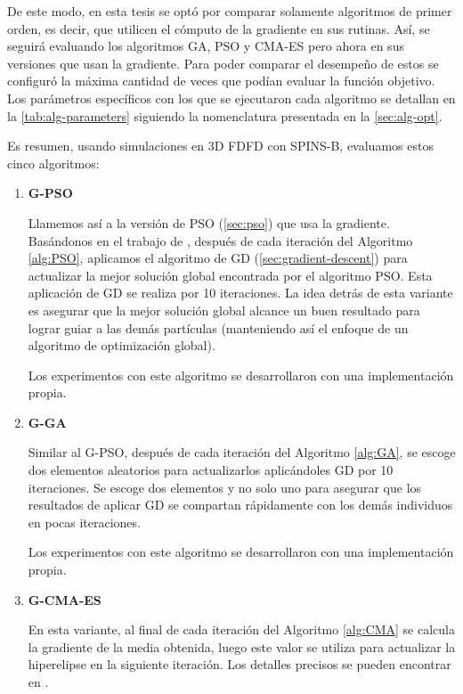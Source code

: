 De este modo, en esta tesis se optó por comparar solamente algoritmos de primer orden, es decir, que utilicen
el cómputo de la gradiente en sus rutinas. Así, se seguirá evaluando los algoritmos GA, PSO y CMA-ES pero
ahora en sus versiones que usan la gradiente.
Para poder comparar el desempeño de estos se configuró la máxima cantidad de veces que podían
evaluar la función objetivo. 
Los parámetros específicos con los que se ejecutaron cada algoritmo se detallan en la
\autoref{tab:alg-parameters} siguiendo la nomenclatura presentada en la \autoref{sec:alg-opt}.

Es resumen, usando simulaciones en 3D FDFD con SPINS-B, evaluamos estos cinco algoritmos:

\begin{enumerate}
  \item \textbf{G-PSO}

  Llamemos así a la versión de PSO (\autoref{sec:pso}) que usa la gradiente. 
  Basándonos en el trabajo de \cite{Demidova2020}, después de cada iteración
  del Algoritmo \ref{alg:PSO}, aplicamos el algoritmo de GD
  (\autoref{sec:gradient-descent}) para actualizar la mejor solución global encontrada por el 
  algoritmo PSO. Esta aplicación de GD se realiza por 10 iteraciones.
  La idea detrás de esta variante es asegurar que la mejor solución global alcance un buen resultado
  para lograr guiar a las demás partículas (manteniendo así el enfoque de un algoritmo de optimización
  global).
  
  Los experimentos con este algoritmo se desarrollaron con una implementación propia.

  \item \textbf{G-GA}

  Similar al G-PSO, después de cada iteración del Algoritmo \ref{alg:GA}, se escoge dos
  elementos aleatorios para actualizarlos aplicándoles GD por 10 iteraciones.
  Se escoge dos elementos y no solo uno para asegurar que los resultados de aplicar GD
  se compartan rápidamente con los demás individuos en pocas iteraciones.

  Los experimentos con este algoritmo se desarrollaron con una implementación propia.

  \item \textbf{G-CMA-ES}

  En esta variante, al final de cada iteración del Algoritmo \ref{alg:CMA} se
  calcula la gradiente de la media obtenida, luego este valor se utiliza para
  actualizar la hiperelipse en la siguiente iteración.
  Los detalles precisos se pueden encontrar en \cite{Nikolaus2021}.


\end{enumerate}

